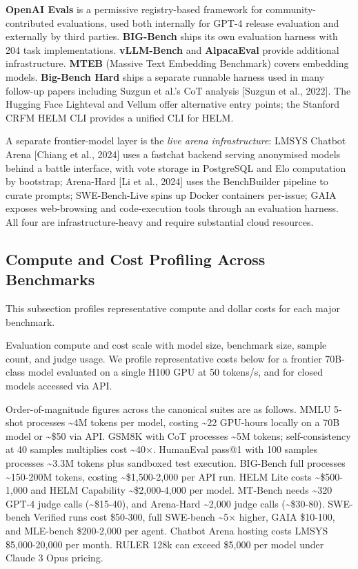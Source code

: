 \textbf{OpenAI Evals} is a permissive registry-based framework for community-contributed evaluations, used both internally for GPT-4 release evaluation and externally by third parties. \textbf{BIG-Bench} ships its own evaluation harness with 204 task implementations. \textbf{vLLM-Bench} and \textbf{AlpacaEval} provide additional infrastructure. \textbf{MTEB} (Massive Text Embedding Benchmark) covers embedding models. \textbf{Big-Bench Hard} ships a separate runnable harness used in many follow-up papers including Suzgun et al.'s CoT analysis {[}Suzgun et al., 2022{]}. The Hugging Face Lighteval and Vellum offer alternative entry points; the Stanford CRFM HELM CLI provides a unified CLI for HELM.

A separate frontier-model layer is the \emph{live arena infrastructure}: LMSYS Chatbot Arena {[}Chiang et al., 2024{]} uses a fastchat backend serving anonymised models behind a battle interface, with vote storage in PostgreSQL and Elo computation by bootstrap; Arena-Hard {[}Li et al., 2024{]} uses the BenchBuilder pipeline to curate prompts; SWE-Bench-Live spins up Docker containers per-issue; GAIA exposes web-browsing and code-execution tools through an evaluation harness. All four are infrastructure-heavy and require substantial cloud resources.

\subsection{Compute and Cost Profiling Across Benchmarks}\label{compute-and-cost-profiling-across-benchmarks}

This subsection profiles representative compute and dollar costs for each major benchmark.

Evaluation compute and cost scale with model size, benchmark size, sample count, and judge usage. We profile representative costs below for a frontier 70B-class model evaluated on a single H100 GPU at 50 tokens/s, and for closed models accessed via API.

Order-of-magnitude figures across the canonical suites are as follows. MMLU 5-shot processes \textasciitilde4M tokens per model, costing \textasciitilde22 GPU-hours locally on a 70B model or \textasciitilde\$50 via API. GSM8K with CoT processes \textasciitilde5M tokens; self-consistency at 40 samples multiplies cost \textasciitilde40×. HumanEval pass@1 with 100 samples processes \textasciitilde3.3M tokens plus sandboxed test execution. BIG-Bench full processes \textasciitilde150-200M tokens, costing \textasciitilde\$1,500-2,000 per API run. HELM Lite costs \textasciitilde\$500-1,000 and HELM Capability \textasciitilde\$2,000-4,000 per model. MT-Bench needs \textasciitilde320 GPT-4 judge calls (\textasciitilde\$15-40), and Arena-Hard \textasciitilde2,000 judge calls (\textasciitilde\$30-80). SWE-bench Verified runs cost \$50-300, full SWE-bench \textasciitilde5× higher, GAIA \$10-100, and MLE-bench \$200-2,000 per agent. Chatbot Arena hosting costs LMSYS \$5,000-20,000 per month. RULER 128k can exceed \$5,000 per model under Claude 3 Opus pricing.

